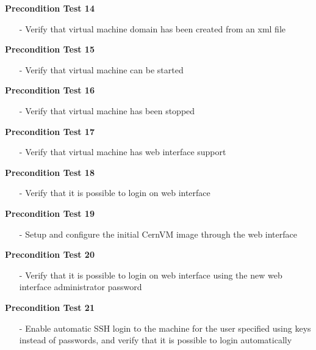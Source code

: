 \begin{description}
\item {\bf	 Precondition Test 14}
		\begin{itemize}
		\item[-]	Verify that virtual machine domain has been created from an xml file
		\end{itemize}
		
\item {\bf	 Precondition Test 15}
		\begin{itemize}
		\item[-]	Verify that virtual machine can be started
		\end{itemize}
		
\item {\bf	 Precondition Test 16}
		\begin{itemize}
		\item[-]	Verify that virtual machine has been stopped
		\end{itemize}

\item {\bf	 Precondition Test 17}
		\begin{itemize}
		\item[-]	Verify that virtual machine has web interface support
		\end{itemize}
		
\item {\bf	 Precondition Test 18}
		\begin{itemize}
		\item[-]	Verify that it is possible to login on web interface
		\end{itemize}

\item {\bf	 Precondition Test 19}
		\begin{itemize}
		\item[-]	Setup and configure the initial CernVM image through the web interface
		\end{itemize}
		
\item {\bf	 Precondition Test 20}
		\begin{itemize}
		\item[-]	Verify that it is possible to login on web interface using the new web
						interface administrator password
		\end{itemize}
		
\item {\bf	 Precondition Test 21}
		\begin{itemize}
		\item[-]	Enable automatic SSH login to the machine for the user specified using
						keys instead of passwords, and verify that it is possible to login automatically
		\end{itemize}


\end{description}

